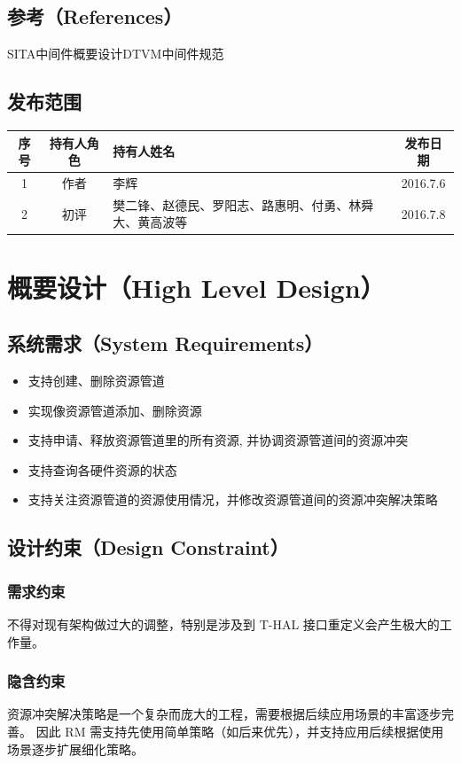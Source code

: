 \documentclass[UTF8]{ctexart}
\begin{document}
\subsection{参考（References）}
		SITA中间件概要设计DTVM中间件规范
\subsection{发布范围}
\begin{tabular}{|c|c|p{150pt}|c|}
		\hline
		序号&持有人角色&持有人姓名&发布日期\\
		\hline
		1&作者&李辉&2016.7.6\\
		\hline
		2&初评&樊二锋、赵德民、罗阳志、路惠明、付勇、林舜大、黄高波等&2016.7.8\\
		\hline
		\end{tabular}
\newpage
\section{概要设计（High Level Design）}
\subsection{系统需求（System Requirements）}
			\begin{itemize}
        		\item 支持创建、删除资源管道
        		\item 实现像资源管道添加、删除资源
        		\item 支持申请、释放资源管道里的所有资源, 并协调资源管道间的资源冲突
        		\item 支持查询各硬件资源的状态
        		\item 支持关注资源管道的资源使用情况，并修改资源管道间的资源冲突解决策略
     		\end {itemize}
\subsection{设计约束（Design Constraint）}
\subsubsection{需求约束}
不得对现有架构做过大的调整，特别是涉及到 T-HAL 接口重定义会产生极大的工作量。
\subsubsection{隐含约束}
资源冲突解决策略是一个复杂而庞大的工程，需要根据后续应用场景的丰富逐步完善。
		 因此 RM 需支持先使用简单策略（如后来优先），并支持应用后续根据使用场景逐步扩展细化策略。
\end{document}
